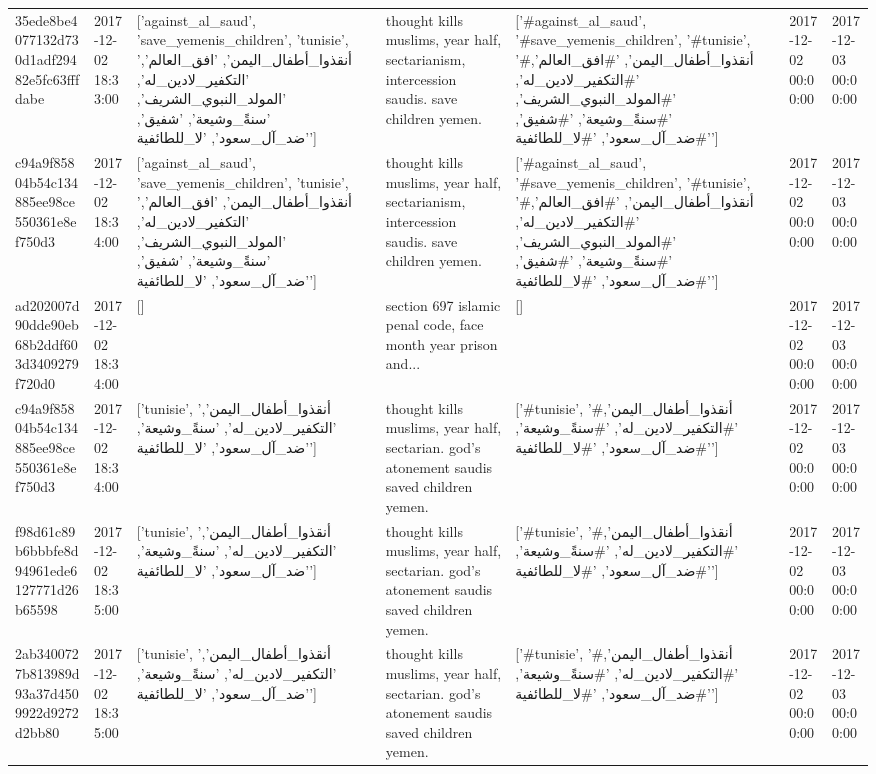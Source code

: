 \begin{tabular}{lllllll}
35ede8be4077132d730d1adf29482e5fc63fffdabe & 2017-12-02 18:33:00 & ['against_al_saud', 'save_yemenis_children', 'tunisie', 'أنقذوا_أطفال_اليمن', 'افق_العالم', 'التكفير_لادين_له', 'المولد_النبوي_الشريف', 'سنةً_وشيعة', 'شفيق', 'ضد_آل_سعود', 'لا_للطائفية'] & thought kills muslims, year half, sectarianism, intercession saudis. save children yemen. & ['#against_al_saud', '#save_yemenis_children', '#tunisie', '#أنقذوا_أطفال_اليمن', '#افق_العالم', '#التكفير_لادين_له', '#المولد_النبوي_الشريف', '#سنةً_وشيعة', '#شفيق', '#ضد_آل_سعود', '#لا_للطائفية'] & 2017-12-02 00:00:00 & 2017-12-03 00:00:00 \\
c94a9f85804b54c134885ee98ce550361e8ef750d3 & 2017-12-02 18:34:00 & ['against_al_saud', 'save_yemenis_children', 'tunisie', 'أنقذوا_أطفال_اليمن', 'افق_العالم', 'التكفير_لادين_له', 'المولد_النبوي_الشريف', 'سنةً_وشيعة', 'شفيق', 'ضد_آل_سعود', 'لا_للطائفية'] & thought kills muslims, year half, sectarianism, intercession saudis. save children yemen. & ['#against_al_saud', '#save_yemenis_children', '#tunisie', '#أنقذوا_أطفال_اليمن', '#افق_العالم', '#التكفير_لادين_له', '#المولد_النبوي_الشريف', '#سنةً_وشيعة', '#شفيق', '#ضد_آل_سعود', '#لا_للطائفية'] & 2017-12-02 00:00:00 & 2017-12-03 00:00:00 \\
ad202007d90dde90eb68b2ddf603d3409279f720d0 & 2017-12-02 18:34:00 & [] & section 697 islamic penal code, face month year prison and... & [] & 2017-12-02 00:00:00 & 2017-12-03 00:00:00 \\
c94a9f85804b54c134885ee98ce550361e8ef750d3 & 2017-12-02 18:34:00 & ['tunisie', 'أنقذوا_أطفال_اليمن', 'التكفير_لادين_له', 'سنةً_وشيعة', 'ضد_آل_سعود', 'لا_للطائفية'] & thought kills muslims, year half, sectarian. god's atonement saudis saved children yemen. & ['#tunisie', '#أنقذوا_أطفال_اليمن', '#التكفير_لادين_له', '#سنةً_وشيعة', '#ضد_آل_سعود', '#لا_للطائفية'] & 2017-12-02 00:00:00 & 2017-12-03 00:00:00 \\
f98d61c89b6bbbfe8d94961ede6127771d26b65598 & 2017-12-02 18:35:00 & ['tunisie', 'أنقذوا_أطفال_اليمن', 'التكفير_لادين_له', 'سنةً_وشيعة', 'ضد_آل_سعود', 'لا_للطائفية'] & thought kills muslims, year half, sectarian. god's atonement saudis saved children yemen. & ['#tunisie', '#أنقذوا_أطفال_اليمن', '#التكفير_لادين_له', '#سنةً_وشيعة', '#ضد_آل_سعود', '#لا_للطائفية'] & 2017-12-02 00:00:00 & 2017-12-03 00:00:00 \\
2ab3400727b813989d93a37d4509922d9272d2bb80 & 2017-12-02 18:35:00 & ['tunisie', 'أنقذوا_أطفال_اليمن', 'التكفير_لادين_له', 'سنةً_وشيعة', 'ضد_آل_سعود', 'لا_للطائفية'] & thought kills muslims, year half, sectarian. god's atonement saudis saved children yemen. & ['#tunisie', '#أنقذوا_أطفال_اليمن', '#التكفير_لادين_له', '#سنةً_وشيعة', '#ضد_آل_سعود', '#لا_للطائفية'] & 2017-12-02 00:00:00 & 2017-12-03 00:00:00 \\

\end{tabular}

